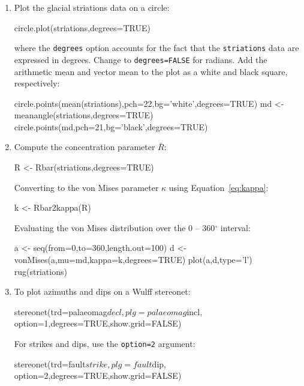 \begin{enumerate}

\item Plot the glacial striations data on a circle:

\begin{script}
circle.plot(striations,degrees=TRUE)
\end{script}

\noindent where the \texttt{degrees} option accounts for the fact that
the \texttt{striations} data are expressed in degrees.  Change to
\texttt{degrees=FALSE} for radians. Add the arithmetic mean and vector
mean to the plot as a white and black square, respectively:

\begin{script}[firstnumber=2]
circle.points(mean(striations),pch=22,bg='white',degrees=TRUE)
md <- meanangle(striations,degrees=TRUE)
circle.points(md,pch=21,bg='black',degrees=TRUE)
\end{script}

\item\label{it:Rbar} Compute the concentration parameter $\bar{R}$:

\begin{script}
R <- Rbar(striations,degrees=TRUE)
\end{script}

Converting to the von Mises parameter $\kappa$ using
Equation~\ref{eq:kappa}:

\begin{script}[firstnumber=2]
k <- Rbar2kappa(R)
\end{script}

Evaluating the von Mises distribution over the 0 -- 360$^{\circ}$
interval:

\begin{script}[firstnumber=3]
a <- seq(from=0,to=360,length.out=100)
d <- vonMises(a,mu=md,kappa=k,degrees=TRUE)
plot(a,d,type='l')
rug(striations)
\end{script}

\item To plot azimuths and dips on a Wulff stereonet:

\begin{script}
stereonet(trd=palaeomag$decl,plg=palaeomag$incl,
          option=1,degrees=TRUE,show.grid=FALSE)
\end{script}

For strikes and dips, use the \texttt{option=2} argument:

\begin{script}
stereonet(trd=fault$strike,plg=fault$dip,
          option=2,degrees=TRUE,show.grid=FALSE)
\end{script}


\end{enumerate}
